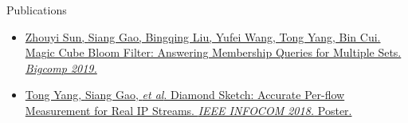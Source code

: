 \begin{MySection}{Publications}

\vspace{-0.1in}

\begin{itemize}
    \item \href{http://net.pku.edu.cn/~yangtong/uploads/MagicCube.pdf}
    {Zhouyi Sun, \underline{Siang Gao}, Bingqing Liu, Yufei Wang,
    Tong Yang, Bin Cui. Magic Cube Bloom Filter: Answering Membership
    Queries for Multiple Sets. \textit{Bigcomp 2019.}}
    \item \href{https://ieeexplore.ieee.org/document/8406946/}
    {Tong Yang, \underline{Siang Gao}, \textit{et al}. 
    Diamond Sketch: Accurate Per-flow Measurement 
    for Real IP Streams. 
    \textit{IEEE INFOCOM 2018.} Poster.}
\end{itemize}

\vspace{-17pt}

\end{MySection}